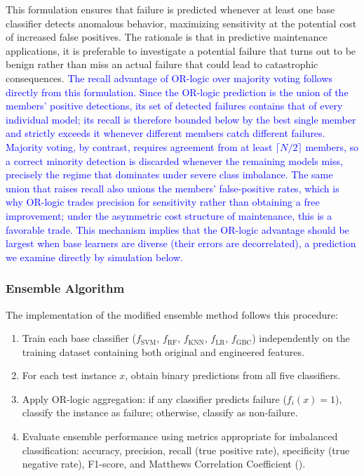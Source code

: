 \documentclass[final,5p, twocolumn]{elsarticle}
\begin{document}
This formulation ensures that failure is predicted whenever at least one base classifier detects anomalous behavior, maximizing sensitivity at the potential cost of increased false positives. The rationale is that in predictive maintenance applications, it is preferable to investigate a potential failure that turns out to be benign rather than miss an actual failure that could lead to catastrophic consequences. \textcolor{blue}{The recall advantage of OR-logic over majority voting follows directly from this formulation. Since the OR-logic prediction is the union of the members' positive detections, its set of detected failures contains that of every individual model; its recall is therefore bounded below by the best single member and strictly exceeds it whenever different members catch different failures. Majority voting, by contrast, requires agreement from at least $\lceil N/2 \rceil$ members, so a correct minority detection is discarded whenever the remaining models miss, precisely the regime that dominates under severe class imbalance. The same union that raises recall also unions the members' false-positive rates, which is why OR-logic trades precision for sensitivity rather than obtaining a free improvement; under the asymmetric cost structure of maintenance, this is a favorable trade. This mechanism implies that the OR-logic advantage should be largest when base learners are diverse (their errors are decorrelated), a prediction we examine directly by simulation below.}

\subsubsection{Ensemble Algorithm}

The implementation of the modified ensemble method follows this procedure:
\begin{enumerate}
    \item Train each base classifier ($f_{\text{SVM}}$, $f_{\text{RF}}$, $f_{\text{KNN}}$, $f_{\text{LR}}$, $f_{\text{GBC}}$) independently on the training dataset containing both original and engineered features.
    
    \item For each test instance $x$, obtain binary predictions from all five classifiers.
    
    \item Apply OR-logic aggregation: if any classifier predicts failure ($f_i(x) = 1$), classify the instance as failure; otherwise, classify as non-failure.
    
    \item Evaluate ensemble performance using metrics appropriate for imbalanced classification: accuracy, precision, recall (true positive rate), specificity (true negative rate), F1-score, and Matthews Correlation Coefficient (\cite{chicco2020advantages}).
\end{enumerate}
\end{document}
